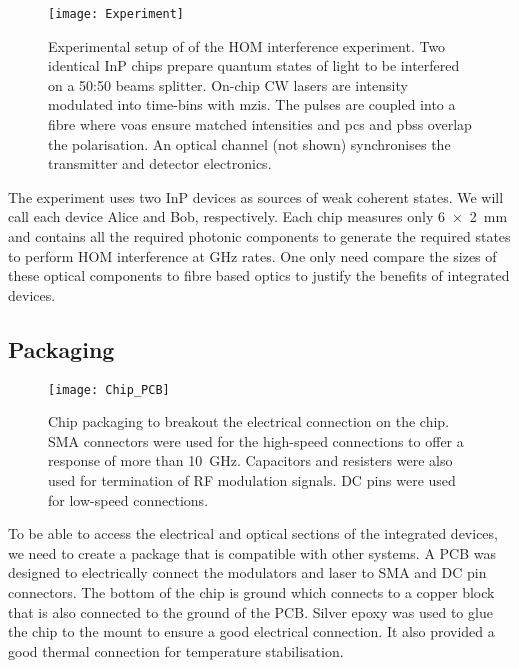 \begin{figure}[tbp]
	\centering
	\texttt{[image: Experiment]}
	\caption[Hon-Ou-Mandel interference experimental setup]{Experimental setup of of the \ac{HOM} interference experiment. Two identical \ac{InP} chips prepare quantum states of light to be interfered on a {50:50} beams splitter. On-chip \ac{CW} lasers are intensity modulated into time-bins with \acp{mzi}. The pulses are coupled into a fibre where \acp{voa} ensure matched intensities and \acp{pc} and \acp{pbs} overlap the polarisation. An optical channel (not shown) synchronises the transmitter and detector electronics.}
	\label{fig:hom_experiment}
\end{figure}

The experiment uses two \ac{InP} devices as sources of weak coherent states. We will call each device Alice and Bob, respectively. Each chip measures only \SI[product-units=power]{6x2}{mm} and contains all the required photonic components to generate the required states to perform \ac{HOM} interference at GHz rates. One only need compare the sizes of these optical components to fibre based optics to justify the benefits of integrated devices.

\subsection{Packaging}

\begin{figure}[tbp]
	\centering
	\texttt{[image: Chip\_PCB]}
	\caption[Transmitter PCB package]{Chip packaging to breakout the electrical connection on the chip. SMA connectors were used for the high-speed connections to offer a response of more than \SI{10}{\GHz}. Capacitors and resisters were also used for termination of RF modulation signals. DC pins were used for low-speed connections.}
	\label{fig:chip_pcb}
\end{figure}

To be able to access the electrical and optical sections of the integrated devices, we need to create a package that is compatible with other systems. A PCB was designed to electrically connect the modulators and laser to SMA and DC pin connectors. The bottom of the chip is ground which connects to a copper block that is also connected to the ground of the PCB. Silver epoxy was used to glue the chip to the mount to ensure a good electrical connection. It also provided a good thermal connection for temperature stabilisation.

